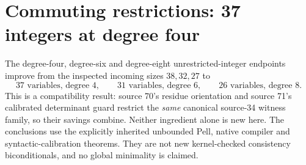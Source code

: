 \section{Commuting restrictions: 37 integers at degree four}
The degree-four, degree-six and degree-eight unrestricted-integer endpoints
improve from the inspected incoming sizes $38,32,27$ to
\[
 \boxed{37\text{ variables, degree }4},\qquad
 \boxed{31\text{ variables, degree }6},\qquad
 \boxed{26\text{ variables, degree }8}.
\]
This is a compatibility result: source 70's residue orientation and source 71's
calibrated determinant guard restrict the \emph{same} canonical source-34
witness family, so their savings combine. Neither ingredient alone is new here.
The conclusions use the explicitly inherited unbounded Pell, native compiler
and syntactic-calibration theorems. They are not new kernel-checked consistency
biconditionals, and no global minimality is claimed.

